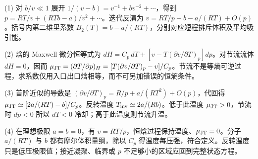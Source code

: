 (1) 对 \(b/v\ll1\) 展开 \(1/(v-b)=v^{-1}+bv^{-2}+\cdots\)，得到 \(p=RT/v+(RTb-a)/v^2+\cdots\)。迭代反演为 \(v=RT/p+b-a/(RT)+O(p)\)。括号内第二维里系数 \(B_2(T)=b-a/(RT)\)，分别对应短程排斥体积及平均吸引能。

(2) 焓的 Maxwell 微分恒等式为 \(dH=C_p\,dT+[v-T(\partial v/\partial T)_p]dp\)。对节流流体 \(dH=0\)，因而 \(\mu_{\rm JT}=(\partial T/\partial p)_H=[T(\partial v/\partial T)_p-v]/C_p\)。节流不是等熵可逆过程，求系数仅用入口出口焓相等，而不可另加错误的恒熵条件。

(3) 首阶近似的导数是 \((\partial v/\partial T)_p=R/p+a/(RT^2)+O(p)\)，代回得 \(\mu_{\rm JT}\simeq[2a/(RT)-b]/C_p\)。反转温度 \(T_{\rm inv}\simeq2a/(Rb)\)。低于此温度 \(\mu_{\rm JT}>0\)，节流时 \(dp<0\) 所以 \(dT<0\) 冷却；高于此温度则节流升温。

(4) 在理想极限 \(a=b=0\)，有 \(v=RT/p\)，恒焓过程保持温度、\(\mu_{\rm JT}=0\)。分子 \(a/(RT)\) 与 \(b\) 都有摩尔体积量纲，除以 \(C_p\) 得温度每压强，符合定义。反转温度只是低压极限值；接近凝聚、临界或 \(p\) 不足够小的区域应回到完整状态方程。
